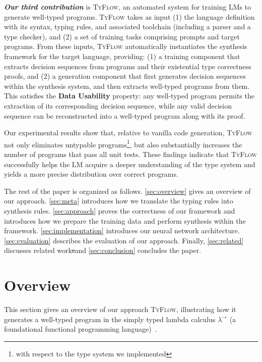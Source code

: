 \documentclass[manuscript,screen]{acmart}
\makeatletter
\newcommand{\toolname}[1]{\textsc{#1}}
\newcommand{\mainname}{\toolname{TyFlow}\xspace}
\newcommand{\stlc}{\lambda^{\rightarrow}}
\providecommand{\DIFdel}[1]{{\protect\color{red}\sout{#1}}} %
\providecommand{\DIFaddbegin}{} %
\providecommand{\DIFaddend}{} %
\providecommand{\DIFdelbegin}{} %
\providecommand{\DIFdelend}{} %
\providecommand{\DIFscaledelfig}{0.5}
\newlength{\DIFdelgraphicswidth} %
\newlength{\DIFdelgraphicsheight} %
\providecommand{\DIFaddincludegraphics}[2][]{{\color{blue}\fbox{\DIFOincludegraphics[#1]{#2}}}} %
\providecommand{\DIFdelincludegraphics}[2][]{%
\sbox{\DIFdelgraphicsbox}{\DIFOincludegraphics[#1]{#2}}%
\settoboxwidth{\DIFdelgraphicswidth}{\DIFdelgraphicsbox} %
\settoboxtotalheight{\DIFdelgraphicsheight}{\DIFdelgraphicsbox} %
\scalebox{\DIFscaledelfig}{%
\parbox[b]{\DIFdelgraphicswidth}{\usebox{\DIFdelgraphicsbox}\\[-\baselineskip] \rule{\DIFdelgraphicswidth}{0em}}\llap{\resizebox{\DIFdelgraphicswidth}{\DIFdelgraphicsheight}{%
\setlength{\unitlength}{\DIFdelgraphicswidth}%
\begin{picture}(1,1)%
\thicklines\linethickness{2pt} %
{\color[rgb]{1,0,0}\put(0,0){\framebox(1,1){}}}%
{\color[rgb]{1,0,0}\put(0,0){\line( 1,1){1}}}%
{\color[rgb]{1,0,0}\put(0,1){\line(1,-1){1}}}%
\end{picture}%
}\hspace*{3pt}}} %
} %
\DeclareRobustCommand{\DIFaddbegin}{\DIFOaddbegin \let\includegraphics\DIFaddincludegraphics} %
\DeclareRobustCommand{\DIFaddend}{\DIFOaddend \let\includegraphics\DIFOincludegraphics} %
\DeclareRobustCommand{\DIFdelbegin}{\DIFOdelbegin \let\includegraphics\DIFdelincludegraphics} %
\DeclareRobustCommand{\DIFdelend}{\DIFOaddend \let\includegraphics\DIFOincludegraphics} %
\let\sout@orig\sout %
\renewcommand{\sout}[1]{\ifmmode\text{\sout@orig{\ensuremath{#1}}}\else\sout@orig{#1}\fi} %
\makeatother
\begin{document}
\textbf{\textit{Our third contribution}} is \mainname, an automated system for training LMs to generate well-typed programs. \mainname takes as input (1) the language definition with its syntax, typing rules, and associated toolchain (including a parser and a type checker), and (2) a set of training tasks comprising prompts and target programs. 
From these inputs, \mainname automatically instantiates the synthesis framework for the target language, providing: (1) a training component that extracts decision sequences from programs and their existential type correctness proofs, and (2) a generation component that first generates decision sequences within the synthesis system, and then extracts well-typed programs from them.
This satisfies the \textbf{Data Usability} property: any well-typed program permits the extraction of its corresponding decision sequence, while any valid decision sequence can be reconstructed into a well-typed program along with its proof.

\smallskip
Our experimental results show that, relative to vanilla code generation, \mainname not only eliminates untypable programs\footnote{with respect to the type system we implemented}, but also substantially increases the number of programs that pass all unit tests. These findings indicate that \mainname successfully helps the LM acquire a deeper understanding of the type system and yields a more precise distribution over correct programs.

The rest of the paper is organized as follows. 
\autoref{sec:overview} gives an overview of our approach. 
\autoref{sec:meta} introduces how we translate the typing rules into synthesis rules. 
\autoref{sec:approach} proves the correctness of our framework and introduces how we prepare the training data and perform synthesis within the framework. 
\autoref{sec:implementation} introduces our neural network architecture. 
\autoref{sec:evaluation} describes the evaluation of our approach. 
Finally, \autoref{sec:related} discusses related work\DIFdelbegin \DIFdel{s}\DIFdelend  and \autoref{sec:conclusion} concludes the paper.
\DIFaddbegin 

\DIFaddend \section{Overview \label{sec:overview}}

This section gives an overview of our approach \mainname, illustrating how it generates a well-typed program in the simply typed lambda calculus $\stlc$ (a foundational functional programming language)~\cite{DBLP:journals/jsyml/Church40}.
\end{document}
